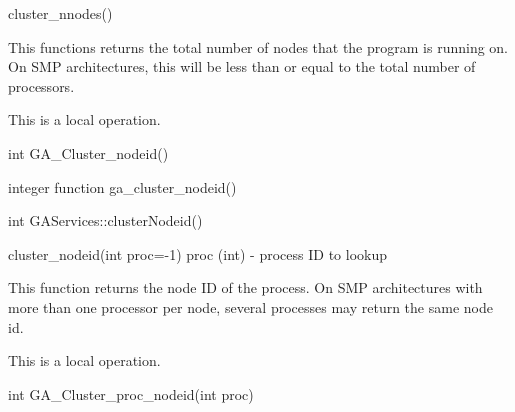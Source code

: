 \documentclass[12pt]{article}
\begin{document}
\begin{pyapi}
\begin{pycode}
cluster_nnodes() 
\end{pycode}
\end{pyapi}

\begin{desc}


This functions returns the total number of nodes that the program is running 
on. On SMP architectures, this will be less than or equal to the total number 
of processors.

This is a  local operation.
\end{desc}


\begin{capi}
\begin{ccode}
int GA_Cluster_nodeid()
\end{ccode}
\end{capi}

\begin{fapi}
\begin{fcode}
integer function ga_cluster_nodeid()
\end{fcode}
\end{fapi}

\begin{cxxapi}
\begin{cxxcode}
int GAServices::clusterNodeid()
\end{cxxcode}
\end{cxxapi}

\begin{pyapi}
\begin{pycode}
cluster_nodeid(int proc=-1)  
   proc (int)    - process ID to lookup
\end{pycode}
\end{pyapi}

\begin{desc}

This function returns the node ID of the process. On SMP architectures with more 
than one processor per node, several processes may return the same node id.

This is a  local operation.
\end{desc}


\begin{capi}
\begin{ccode}
int GA_Cluster_proc_nodeid(int proc)
\end{ccode}
\begin{funcargs}
\end{funcargs}
\end{capi}
\end{document}
